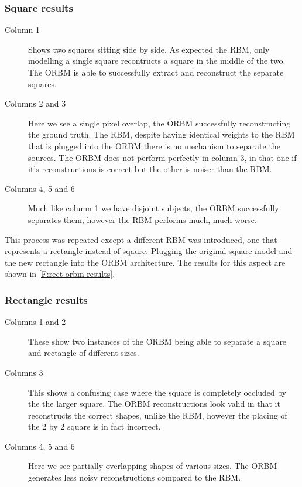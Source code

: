 \subsubsection{Square results}
\begin{description}
  \item[Column 1] Shows two squares sitting side by side. As expected the RBM, only modelling a single square recontructs a square in the middle of the two. The ORBM is able to successfully extract and reconstruct the separate squares.
  \item[Columns 2 and 3] Here we see a single pixel overlap, the ORBM successfully reconstructing the ground truth. The RBM, despite having identical weights to the RBM that is plugged into the ORBM there is no mechanism to separate the sources. The ORBM does not perform perfectly in column 3, in that one if it's reconstructions is correct but the other is noiser than the RBM.
  \item[Columns 4, 5 and 6] Much like column 1 we have disjoint subjects, the ORBM successfully separates them, however the RBM performs much, much worse.
\end{description}

This process was repeated except a different RBM was introduced, one that represents a rectangle instead of sqaure. Plugging the original square model and the new rectangle into the ORBM architecture. The results for this aspect are shown in \ref{F:rect-orbm-results}.

\subsubsection{Rectangle results}
\begin{description}
  \item[Columns 1 and 2] These show two instances of the ORBM being able to separate a square and rectangle of different sizes.
  \item[Columns 3] This shows a confusing case where the square is completely occluded by the the larger square. The ORBM reconstructions look valid in that it reconstructs the correct shapes, unlike the RBM, however the placing of the 2 by 2 square is in fact incorrect.
  \item[Columns 4, 5 and 6] Here we see partially overlapping shapes of various sizes. The ORBM generates less noisy reconstructions compared to the RBM.
\end{description}




